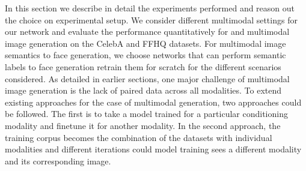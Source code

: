 \documentclass[10pt,twocolumn,letterpaper]{article}
\begin{document}
In this section we describe in detail the experiments performed  and reason out the choice on experimental setup. We consider different multimodal settings for our network and  evaluate the performance quantitatively for  and multimodal image generation on the CelebA and FFHQ datasets.
For multimodal image semantics to face generation, we choose networks that can perform semantic labels to face generation retrain them for scratch for the different scenarios considered. As detailed in earlier sections, one major challenge of multimodal image generation is the lack of paired data across all modalities. To extend existing approaches for the case of multimodal generation, two approaches could be followed. The first is to take a model trained for a particular conditioning modality and finetune it for another modality. In the second approach, the training corpus becomes the combination of the datasets with individual modalities and different iterations could model training sees a different modality and its corresponding image.  
\end{document}
